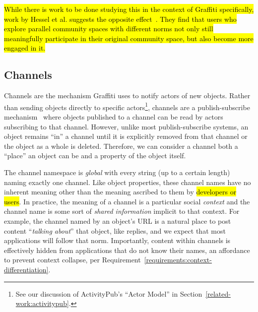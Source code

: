 \hl{%
While there is work to be done studying this in the context of Graffiti specifically,
work by Hessel et al.
suggests the opposite effect~{\cite{highlyrelatedcommunities}}.
They find that users who explore parallel community spaces
with different norms not only still meaningfully participate in their original community space,
but also become more engaged in it.
}%





\subsection{Channels}
\label{concepts:channels}

Channels are the mechanism Graffiti uses to notify
actors of new objects.
Rather than sending objects directly to specific actors\footnote{
    See our discussion of ActivityPub's ``Actor Model'' in Section~\ref{related-work:activitypub}.
},
channels are a publish-subscribe mechanism~\cite{pubsub}
where objects published to a channel
can be read by actors subscribing to that channel.
However, unlike most publish-subscribe systems,
an object remains ``in'' a channel until
it is explicitly removed from that channel
or the object as a whole is deleted.
Therefore, we can consider a channel both a ``place''
an object can be and a property of the object itself.

The channel namespace is \emph{global} with every string (up to a certain length)
naming exactly one channel.
Like object properties, these channel names have no inherent meaning
other than the meaning ascribed to them by {\hl{developers or users}}.
In practice, the meaning of a channel is a particular social \emph{context} and the channel
name is some sort of \emph{shared information} implicit to that context.
For example, the channel named by an object's URL is a natural place to post content ``\emph{talking about}'' that object, like replies, and we expect that most applications will follow that norm.
Importantly, content within channels is effectively hidden from applications
that do not know their names,
an affordance to prevent context collapse, per Requirement~\ref{requirements:context-differentiation}.

